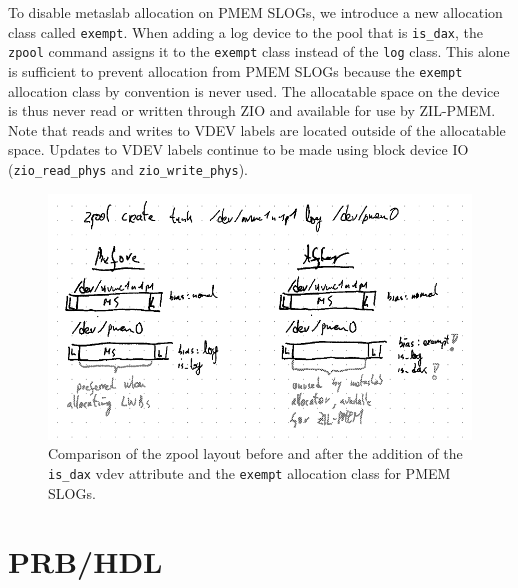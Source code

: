 \documentclass[12pt,a4paper,twoside]{book}
\begin{document}
To disable metaslab allocation on PMEM SLOGs, we introduce a new allocation class called \lstinline{exempt}.
When adding a log device to the pool that is \lstinline{is_dax}, the \lstinline{zpool} command assigns it to the \lstinline{exempt} class instead of the \lstinline{log} class.
This alone is sufficient to prevent allocation from PMEM SLOGs because the \lstinline{exempt} allocation class by convention is never used.
The allocatable space on the device is thus never read or written through ZIO and available for use by ZIL-PMEM.
Note that reads and writes to VDEV labels are located outside of the allocatable space.
Updates to VDEV labels continue to be made using block device IO (\lstinline{zio_read_phys} and \lstinline{zio_write_phys}).

\begin{figure}[h]
    \includegraphics[width=\textwidth]{fig/pmem_aware_vdev_layer_before_after}
    \caption{
        Comparison of the zpool layout before and after the addition of the \lstinline{is_dax} vdev attribute and the \lstinline{exempt} allocation class for PMEM SLOGs.
    }
\end{figure}

\clearpage
\chapter{PRB/HDL}
\end{document}

